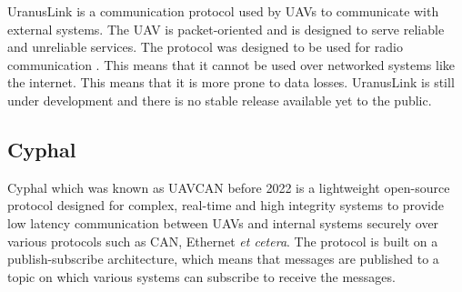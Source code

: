 UranusLink is a communication protocol used by UAVs to communicate with external systems. The UAV is packet-oriented and is designed to serve reliable and unreliable services. The protocol was designed to be used for radio communication \cite{Kriz2015}. This means that it cannot be used over networked systems like the internet. This means that it is more prone to data losses. UranusLink is still under development and there is no stable release available yet to the public.

\subsection{Cyphal}
\label{subsec:cyphal}

Cyphal which was known as UAVCAN before 2022 is a lightweight open-source protocol designed for complex, real-time and high integrity systems to provide low latency communication between UAVs and internal systems securely over various protocols such as CAN, Ethernet \textit{et cetera}. The protocol is built on a publish-subscribe architecture, which means that messages are published to a topic on which various systems can subscribe to receive the messages. \cite{cyphaldocumentation}







